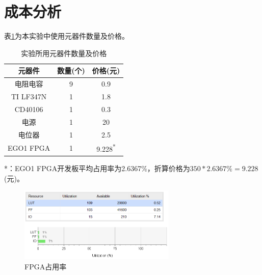 \documentclass[a4paper, twocolumn]{ctexart}
\begin{document}
\section{成本分析}

表\ref{tab:cost}为本实验中使用元器件数量及价格。

\begin{table}[h]
    \centering
    \caption{实验所用元器件数量及价格}
    \label{tab:cost}
    \begin{tabular}{ccc}
        \toprule
        元器件    & 数量(个) & 价格(元)                 \\
        \midrule
        电阻电容  & 9        & 0.9                      \\
        TI LF347N & 1        & 1.8                      \\
        CD40106   & 1        & 0.3                      \\
        电源      & 1        & 20                       \\
        电位器    & 1        & 2.5                      \\
        EGO1 FPGA & 1        & 9.228\textsuperscript{*} \\
        \bottomrule
    \end{tabular}
\end{table}

*：EGO1 FPGA开发板平均占用率为2.6367\%，折算价格为$350 * 2.6367\% = 9.228$(元)。

\begin{figure}[h]
    \centering
    \includegraphics[width=7.5cm]{../assets/utilization.png}
    \caption{FPGA占用率}
\end{figure}
\end{document}
